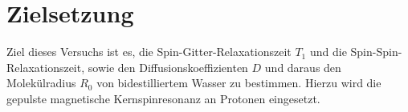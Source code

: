 \section{Zielsetzung}
Ziel dieses Versuchs ist es, die Spin-Gitter-Relaxationszeit $T_1$ und die Spin-Spin-Relaxationszeit, sowie den Diffusionskoeffizienten $D$ und daraus den Molekülradius $R_0$ von bidestilliertem Wasser zu bestimmen. Hierzu wird die gepulste magnetische Kernspinresonanz an Protonen eingesetzt.
